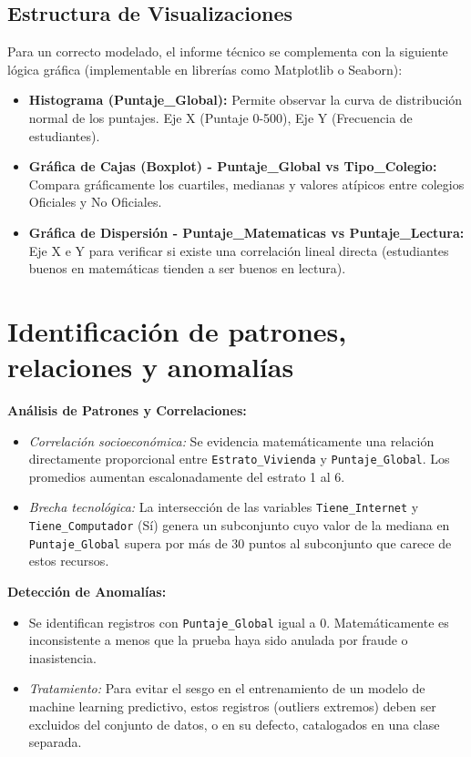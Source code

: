 \documentclass[12pt]{article}
\begin{document}
\subsection{Estructura de Visualizaciones}
Para un correcto modelado, el informe técnico se complementa con la siguiente lógica gráfica (implementable en librerías como Matplotlib o Seaborn):
\begin{itemize}
    \item \textbf{Histograma (Puntaje\_Global):} Permite observar la curva de distribución normal de los puntajes. Eje X (Puntaje 0-500), Eje Y (Frecuencia de estudiantes).
    \item \textbf{Gráfica de Cajas (Boxplot) - Puntaje\_Global vs Tipo\_Colegio:} Compara gráficamente los cuartiles, medianas y valores atípicos entre colegios Oficiales y No Oficiales.
    \item \textbf{Gráfica de Dispersión - Puntaje\_Matematicas vs Puntaje\_Lectura:} Eje X e Y para verificar si existe una correlación lineal directa (estudiantes buenos en matemáticas tienden a ser buenos en lectura).
\end{itemize}

\section{Identificación de patrones, relaciones y anomalías}

\textbf{Análisis de Patrones y Correlaciones:}
\begin{itemize}
    \item \textit{Correlación socioeconómica:} Se evidencia matemáticamente una relación directamente proporcional entre \texttt{Estrato\_Vivienda} y \texttt{Puntaje\_Global}. Los promedios aumentan escalonadamente del estrato 1 al 6.
    \item \textit{Brecha tecnológica:} La intersección de las variables \texttt{Tiene\_Internet} y \texttt{Tiene\_Computador} (Sí) genera un subconjunto cuyo valor de la mediana en \texttt{Puntaje\_Global} supera por más de 30 puntos al subconjunto que carece de estos recursos.
\end{itemize}

\textbf{Detección de Anomalías:}
\begin{itemize}
    \item Se identifican registros con \texttt{Puntaje\_Global} igual a 0. Matemáticamente es inconsistente a menos que la prueba haya sido anulada por fraude o inasistencia.
    \item \textit{Tratamiento:} Para evitar el sesgo en el entrenamiento de un modelo de machine learning predictivo, estos registros (outliers extremos) deben ser excluidos del conjunto de datos, o en su defecto, catalogados en una clase separada.
\end{itemize}
\end{document}
